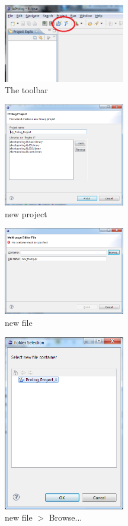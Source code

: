 \begin{figure}
  \includegraphics[width=200px]{images/plugin1.png}
  \caption{The \tuprolog{} toolbar}\label{fig:plugin1}
\end{figure}

\begin{figure}
  \includegraphics[width=200px]{images/plugin2.png}
  \caption{new \tuprolog{} project}\label{fig:plugin2}
\end{figure}

\begin{figure}
  \includegraphics[width=200px]{images/plugin3.png}
  \caption{new \tuprolog{} file}\label{fig:plugin3}
\end{figure}

\begin{figure}
  \includegraphics[width=200px]{images/plugin4.png}
  \caption{new \tuprolog{} file $>$ Browse...}\label{fig:plugin4}
\end{figure}


